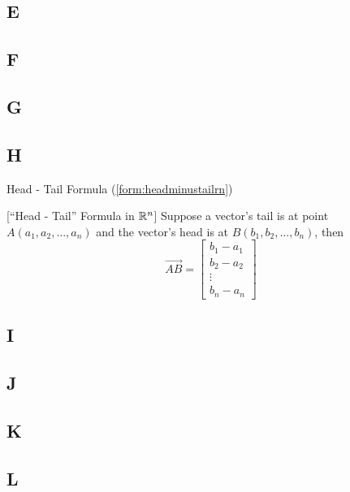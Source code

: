 \documentclass{ximera}
\begin{document}
\subsection{E}

\subsection{F}

\subsection{G}

\subsection{H}
Head - Tail Formula (\ref{form:headminustailrn})
\begin{expandable}
  [``Head - Tail'' Formula in $\mathbb{R}^n$]
Suppose a vector's tail is at point $A(a_1, a_2, \ldots ,a_n)$ and the vector's head is at $B(b_1, b_2, \ldots ,b_n)$, then 
\begin{equation*}
\overrightarrow{AB}=\begin{bmatrix}b_1-a_1\\ b_2-a_2\\ \vdots \\b_n-a_n\end{bmatrix}
\end{equation*}

\end{expandable}

\subsection{I}

\subsection{J}

\subsection{K}

\subsection{L}
\end{document}
